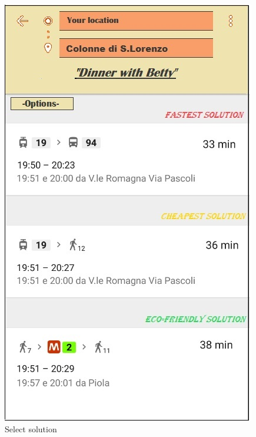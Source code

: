 		\begin{figure}[H]		
			\centerline{\includegraphics[scale=0.4]{Images/suggestedsolution}}
			\caption{Select solution}
		\end{figure}	
